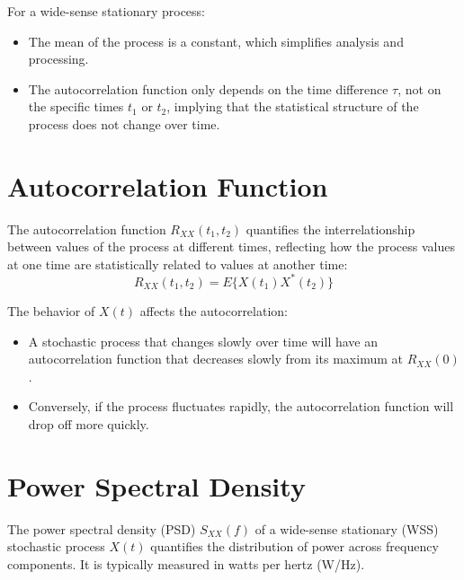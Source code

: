 For a wide-sense stationary process:
\begin{itemize}
    \item The mean of the process is a constant, which simplifies analysis and processing.
    \item The autocorrelation function only depends on the time difference \( \tau \), not on the specific times \( t_1 \) or \( t_2 \), implying that the statistical structure of the process does not change over time.
\end{itemize}

\section*{Autocorrelation Function}

The autocorrelation function \( R_{XX}(t_1, t_2) \) quantifies the interrelationship between values of the process at different times, reflecting how the process values at one time are statistically related to values at another time:
\[ R_{XX}(t_1, t_2) = E\{X(t_1)X^*(t_2)\} \]

The behavior of \( X(t) \) affects the autocorrelation:
\begin{itemize}
    \item A stochastic process that changes slowly over time will have an autocorrelation function that decreases slowly from its maximum at \( R_{XX}(0) \).
    \item Conversely, if the process fluctuates rapidly, the autocorrelation function will drop off more quickly.
\end{itemize}

\section*{Power Spectral Density}

The power spectral density (PSD) \( S_{XX}(f) \) of a wide-sense stationary (WSS) stochastic process \( X(t) \) quantifies the distribution of power across frequency components. It is typically measured in watts per hertz (W/Hz).

